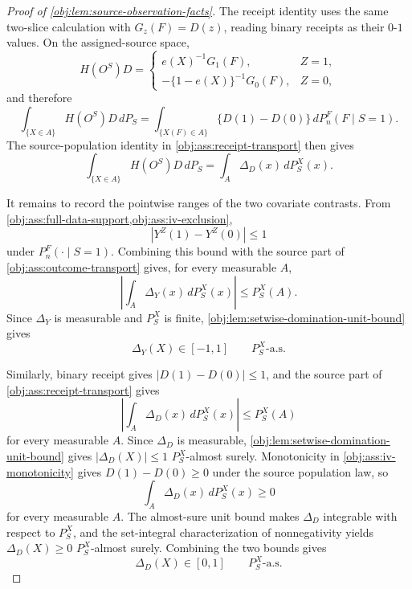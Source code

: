 \begin{proof}[Proof of \cref{obj:lem:source-observation-facts}]
The receipt identity uses the same two-slice calculation with \(G_z(F)=D(z)\), reading binary
receipts as their \(0\)-\(1\) values.  On the assigned-source space,
\[
H(O^S)D
=
\begin{cases}
e(X)^{-1}G_1(F), & Z=1,\\
-\{1-e(X)\}^{-1}G_0(F), & Z=0,
\end{cases}
\]
and therefore
\[
\int_{\{X\in A\}} H(O^S)D\,dP_S
=
\int_{\{X(F)\in A\}}\{D(1)-D(0)\}\,dP_n^F(F\mid S=1).
\]
The source-population identity in \cref{obj:ass:receipt-transport} then gives
\[
\int_{\{X\in A\}} H(O^S)D\,dP_S
=
\int_A\Delta_D(x)\,dP_S^X(x).
\]

It remains to record the pointwise ranges of the two covariate contrasts.  From
\cref{obj:ass:full-data-support,obj:ass:iv-exclusion},
\[
\left|Y^Z(1)-Y^Z(0)\right|\le1
\]
under \(P_n^F(\cdot\mid S=1)\).  Combining this bound with the source part of
\cref{obj:ass:outcome-transport} gives, for every measurable \(A\),
\[
\left|\int_A\Delta_Y(x)\,dP_S^X(x)\right|
\le
P_S^X(A).
\]
Since \(\Delta_Y\) is measurable and \(P_S^X\) is finite, \cref{obj:lem:setwise-domination-unit-bound}
gives
\[
\Delta_Y(X)\in[-1,1]
\qquad P_S^X\text{-a.s.}
\]

Similarly, binary receipt gives \(|D(1)-D(0)|\le1\), and the source part of
\cref{obj:ass:receipt-transport} gives
\[
\left|\int_A\Delta_D(x)\,dP_S^X(x)\right|
\le
P_S^X(A)
\]
for every measurable \(A\).  Since \(\Delta_D\) is measurable, \cref{obj:lem:setwise-domination-unit-bound}
gives \(|\Delta_D(X)|\le1\) \(P_S^X\)-almost surely.  Monotonicity in
\cref{obj:ass:iv-monotonicity} gives \(D(1)-D(0)\ge0\) under the source population law, so
\[
\int_A\Delta_D(x)\,dP_S^X(x)\ge0
\]
for every measurable \(A\).  The almost-sure unit bound makes \(\Delta_D\) integrable with respect
to \(P_S^X\), and the set-integral characterization of nonnegativity yields
\(\Delta_D(X)\ge0\) \(P_S^X\)-almost surely.  Combining the two bounds gives
\[
\Delta_D(X)\in[0,1]
\qquad P_S^X\text{-a.s.}
\]
\end{proof}
